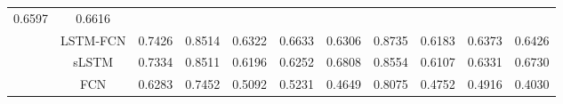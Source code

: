 \documentclass{ieeeaccess}
\begin{document}
\begin{table}[htbp!]
\begin{tabular*}{0.9\textwidth}{c|c|c|cccc|cccc}
  \multicolumn{1}{c|}{0.6597} &
  0.6616 \\ \cline{2-11} 
 &
  LSTM-FCN &
  0.7426 &
  \multicolumn{1}{c|}{0.8514} &
  \multicolumn{1}{c|}{0.6322} &
  \multicolumn{1}{c|}{0.6633} &
  0.6306 &
  \multicolumn{1}{c|}{0.8735} &
  \multicolumn{1}{c|}{0.6183} &
  \multicolumn{1}{c|}{0.6373} &
  0.6426 \\ \cline{2-11} 
 &
  sLSTM &
  0.7334 &
  \multicolumn{1}{c|}{0.8511} &
  \multicolumn{1}{c|}{0.6196} &
  \multicolumn{1}{c|}{0.6252} &
  0.6808 &
  \multicolumn{1}{c|}{0.8554} &
  \multicolumn{1}{c|}{0.6107} &
  \multicolumn{1}{c|}{0.6331} &
  0.6730 \\ \cline{2-11} 
 &
  FCN &
  0.6283 &
  \multicolumn{1}{c|}{0.7452} &
  \multicolumn{1}{c|}{0.5092} &
  \multicolumn{1}{c|}{0.5231} &
  0.4649 &
  \multicolumn{1}{c|}{0.8075} &
  \multicolumn{1}{c|}{0.4752} &
  \multicolumn{1}{c|}{0.4916} &
  0.4030 \\ \hline
\end{tabular*}
\end{table}
\end{document}
